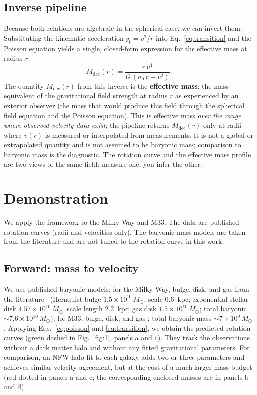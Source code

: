 \documentclass[fleqn,usenatbib]{mnras}
\begin{document}
\subsection{Inverse pipeline}
Because both relations are algebraic in the spherical case, we can invert them. Substituting the kinematic acceleration $g_{\mathrm{t}} = v^2/r$ into Eq.~\ref{eq:transition} and the Poisson equation yields a single, closed-form expression for the effective mass at radius $r$:
\begin{equation}
M_{\mathrm{dec}}(r) = \frac{r\,v^4}{G\,(a_0\,r + v^2)}.
\label{eq:Mdec}
\end{equation}
The quantity $M_{\mathrm{dec}}(r)$ from this inverse is the \textbf{effective mass}: the mass-equivalent of the gravitational field strength at radius $r$ as experienced by an exterior observer (the mass that would produce this field through the spherical field equation and the Poisson equation). This is effective mass \emph{over the range where observed velocity data exist}; the pipeline returns $M_{\mathrm{dec}}(r)$ only at radii where $v(r)$ is measured or interpolated from measurements. It is not a global or extrapolated quantity and is not assumed to be baryonic mass; comparison to baryonic mass is the diagnostic. The rotation curve and the effective mass profile are two views of the same field: measure one, you infer the other.

\section{Demonstration}
\label{sec:demonstration}

We apply the framework to the Milky Way and M33. The data are published rotation curves (radii and velocities only). The baryonic mass models are taken from the literature and are not tuned to the rotation curve in this work.

\subsection{Forward: mass to velocity}
We use published baryonic models: for the Milky Way, bulge, disk, and gas from the literature~\citep{McMillan17} (Hernquist bulge $1.5\times10^{10}\,M_\odot$, scale 0.6~kpc; exponential stellar disk $4.57\times10^{10}\,M_\odot$, scale length 2.2~kpc; gas disk $1.5\times10^{10}\,M_\odot$; total baryonic $\sim 7.6\times10^{10}\,M_\odot$); for M33, bulge, disk, and gas \citep{Corbelli00}; total baryonic mass $\sim 7\times10^9\,M_\odot$. Applying Eqs.~\ref{eq:poisson} and \ref{eq:transition}, we obtain the predicted rotation curves (green dashed in Fig.~\ref{fig:1}, panels a and c). They track the observations without a dark matter halo and without any fitted gravitational parameters. For comparison, an NFW halo fit to each galaxy adds two or three parameters and achieves similar velocity agreement, but at the cost of a much larger mass budget (red dotted in panels a and c; the corresponding enclosed masses are in panels b and d).
\end{document}
